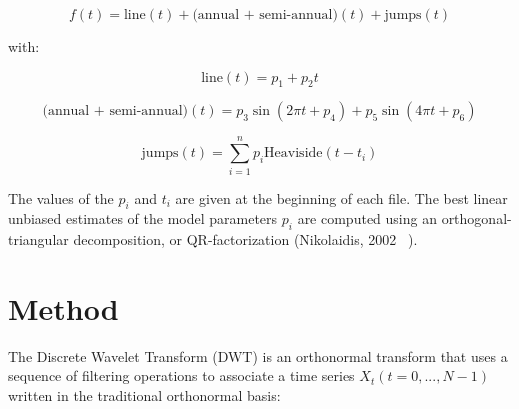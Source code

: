 \documentclass[main.tex]{subfiles}
\begin{document}
\begin{equation}
f (t) = \textrm{line} (t) + \textrm{(annual + semi-annual)} (t) + \textrm{jumps} (t)
\end{equation}

with:

\begin{equation}
\textrm{line} (t) = p_1 + p_2 t
\end{equation}

\begin{equation}
\textrm{(annual + semi-annual)} (t) = p_3 \sin (2 \pi t + p_4) + p_5 \sin (4 \pi t + p_6)
\end{equation}

\begin{equation}
\textrm{jumps} (t) = \sum_{i = 1}^{n} p_i \textrm{Heaviside} (t - t_i)
\end{equation}

The values of the $p_i$ and $t_i$ are given at the beginning of each file. The best linear unbiased estimates of the model parameters $p_i$ are computed using an orthogonal-triangular decomposition, or QR-factorization (Nikolaidis, 2002 ~\cite{NIK_2002}).

\chapter{Method}

The Discrete Wavelet Transform (DWT) is an orthonormal transform that uses a sequence of filtering operations to associate a time series $X_t (t = 0 , ... , N - 1)$ written in the traditional orthonormal basis:
\end{document}
